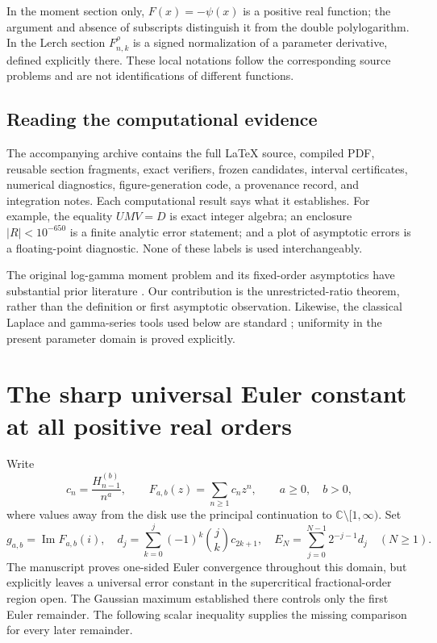 \documentclass[11pt,letterpaper]{article}
\theoremstyle{definition}
\theoremstyle{remark}
\begin{document}
In the moment section only, $F(x)=-\psi(x)$ is a positive real function;
the argument and absence of subscripts distinguish it from the double
polylogarithm. In the Lerch section $F_{n,k}^\rho$ is a signed normalization
of a parameter derivative, defined explicitly there. These local
notations follow the corresponding source problems and are not
identifications of different functions.

\subsection{Reading the computational evidence}

The accompanying archive contains the full LaTeX source, compiled PDF,
reusable section fragments, exact verifiers, frozen candidates, interval
certificates, numerical diagnostics, figure-generation code, a provenance
record, and integration notes. Each computational result says what it
establishes. For example, the equality $UMV=D$ is exact integer algebra;
an enclosure $|R|<10^{-650}$ is a finite analytic error statement; and
a plot of asymptotic errors is a floating-point diagnostic. None of these
labels is used interchangeably.

The original log-gamma moment problem and its fixed-order asymptotics
have substantial prior literature \cite{Amdeberhan,Bailey}. Our contribution
is the unrestricted-ratio theorem, rather than the definition or first
asymptotic observation. Likewise, the classical Laplace and gamma-series
tools used below are standard \cite{DLMFLaplace,DLMFGamma}; uniformity in
the present parameter domain is proved explicitly.


\section{The sharp universal Euler constant at all positive real orders}
\label{newEuler:sec}

Write
\[
 c_n=\frac{H_{n-1}^{(b)}}{n^a},\qquad
 F_{a,b}(z)=\sum_{n\ge1}c_nz^n,
 \qquad a\ge0,\quad b>0,
\]
where values away from the disk use the principal continuation to
$\mathbb C\setminus[1,\infty)$. Set
\[
 g_{a,b}=\operatorname{Im}F_{a,b}(i),\quad
 d_j=\sum_{k=0}^j(-1)^k\binom jk c_{2k+1},\quad
 E_N=\sum_{j=0}^{N-1}2^{-j-1}d_j\quad(N\ge1).
\]
The manuscript proves one-sided Euler convergence throughout this domain,
but explicitly leaves a universal error constant in the supercritical
fractional-order region open. The Gaussian maximum established there
controls only the first Euler remainder. The following scalar inequality
supplies the missing comparison for every later remainder.
\end{document}
